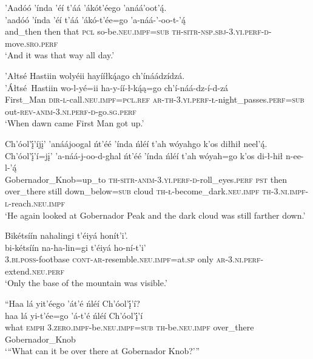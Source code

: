 \ea\label{ex:text5-3-10}
’Aadóó ’índa ’éí t’áá ’ákót’éego ’anáá’oot’ą́.\\
\gll ’aadóó	’índa	’éí	t’áá	’ákó-t’ée=go	’a-náá-’-oo-t-’ą́\\
     and\_then	then	that	\textsc{pcl}	so-be.\textsc{neu}.\textsc{impf}=\textsc{sub}	\textsc{th}-\textsc{sitr}-\textsc{nsp}.\textsc{sbj}-3.\textsc{yi}.\textsc{perf}-\textsc{d}-move.\textsc{sro}.\textsc{perf}\\
\glt `And it was that way all day.'
\z

\ea\label{ex:text5-4-1}
’Ałtsé Hastiin wolyéii hayííłką́ago ch’ínáádzídzá.\\
\gll ’Áłtsé~{Hastiin}	wo-l-yé=ii	ha-y-íí-ł-ką́ą=go	ch’í-náá-dz-í-d-zá\\
     First\_Man	\textsc{dir}-\textsc{l}-call.\textsc{neu}.\textsc{impf}=\textsc{pcl}.\textsc{ref}	\textsc{ar}-\textsc{th}-3.\textsc{yi}.\textsc{perf}-\textsc{ł}-night\_passes.\textsc{perf}=\textsc{sub}	out-\textsc{rev}-\textsc{anim}-3.\textsc{ni}.\textsc{perf}-\textsc{d}-go.\textsc{sg}.\textsc{perf}\\
\glt `When dawn came First Man got up.'
\z

\ea\label{ex:text5-4-2}
Ch’óol’į́’íjį’ ’anáájoogal ńt’éé ’índa ńléí t’ah wóyahgo k’os diłhił neel’ą́.\\
\gll Ch’óol’į́’í=jį’	’a-náá-j-oo-d-ghal	ńt’éé	’índa	ńléí	t’ah	wóyah=go	k’os	di-ł-hił	n-ee-l-’ą́\\
     Gobernador\_Knob=up\_to	\textsc{th}-\textsc{sitr}-\textsc{anim}-3.\textsc{yi}.\textsc{perf}-\textsc{d}-roll\_eyes.\textsc{perf}	\textsc{pst}	then	over\_there	still	down\_below=\textsc{sub}	cloud	\textsc{th}-\textsc{ł}-become\_dark.\textsc{neu}.\textsc{impf}	\textsc{th}-3.\textsc{ni}.\textsc{impf}-\textsc{l}-reach.\textsc{neu}.\textsc{impf}\\
\glt `He again looked at Gobernador Peak and the dark cloud was still farther down.'
\z

\ea\label{ex:text5-4-3}
Bikétsíín nahalingi t’éiyá honít’i’.\\
\gll bi-kétsíín	na-ha-lin=gi	t’éiyá	ho-ní-t’i’\\
     3.\textsc{bi}.\textsc{poss}-footbase	\textsc{cont}-\textsc{ar}-resemble.\textsc{neu}.\textsc{impf}=at.\textsc{sp}	only	\textsc{ar}-3.\textsc{ni}.\textsc{perf}-extend.\textsc{neu}.\textsc{perf}\\
\glt `Only the base of the mountain was visible.'
\z

\ea\label{ex:text5-4-4}
``Haa lá yit’éego ’át’é ńléí Ch’óol’į́’í?\\
\gll haa	lá	yi-t’ée=go	’á-t’é	ńléí	Ch’óol’į́’í\\
     what	\textsc{emph}	3.\textsc{zero}.\textsc{impf}-be.\textsc{neu}.\textsc{impf}=\textsc{sub}	\textsc{th}-be.\textsc{neu}.\textsc{impf}	over\_there	Gobernador\_Knob\\
\glt `{``}What can it be over there at Gobernador Knob?'''
\z

